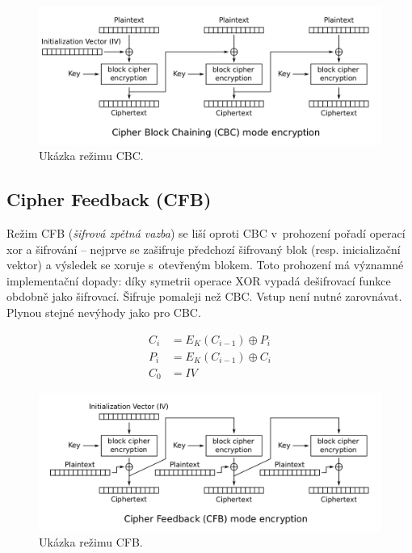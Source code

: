 \begin{figure}[H]
    \centering
    \includegraphics[width=1\linewidth]{rezim_cbc.png}
    \caption{Ukázka režimu CBC.}
\end{figure}

\subsection{Cipher Feedback (CFB)}

Režim CFB (\textit{šifrová zpětná vazba}) se liší oproti CBC v~prohození pořadí operací xor a šifrování -- nejprve se zašifruje předchozí šifrovaný blok (resp. inicializační vektor) a výsledek se xoruje s~otevřeným blokem. Toto prohození má významné implementační dopady: díky symetrii operace XOR vypadá dešifrovací funkce obdobně jako šifrovací. Šifruje pomaleji než CBC. Vstup není nutné zarovnávat. Plynou stejné nevýhody jako pro CBC.

\begin{equation}
\begin{aligned}
C_i &= E_K (C_{i-1}) \oplus P_i \\
P_i &= E_K (C_{i-1}) \oplus C_i \\
C_0 &= IV
\end{aligned}
\end{equation}

\begin{figure}[H]
    \centering
    \includegraphics[width=1\linewidth]{rezim_cfb.png}
    \caption{Ukázka režimu CFB.}
\end{figure}

